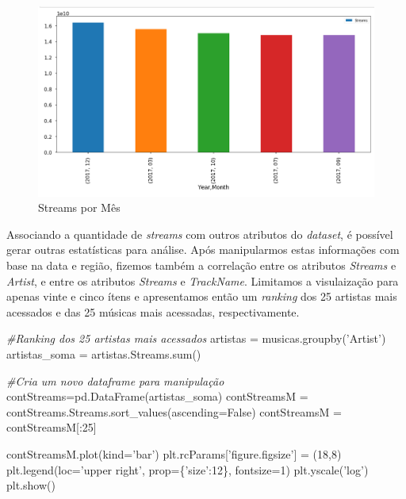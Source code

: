 \documentclass[11pt]{article}
\makeatletter
\def\maxwidth{\ifdim\Gin@nat@width>\linewidth\linewidth
    \else\Gin@nat@width\fi}
\let\Oldincludegraphics\includegraphics
\renewcommand{\includegraphics}[1]{\Oldincludegraphics[width=.8\maxwidth]{#1}}
\newenvironment{Shaded}{}{}
\newcommand{\DecValTok}[1]{\textcolor[rgb]{0.25,0.63,0.44}{{#1}}}
\newcommand{\StringTok}[1]{\textcolor[rgb]{0.25,0.44,0.63}{{#1}}}
\newcommand{\CommentTok}[1]{\textcolor[rgb]{0.38,0.63,0.69}{\textit{{#1}}}}
\newcommand{\NormalTok}[1]{{#1}}
\newcommand{\VariableTok}[1]{\textcolor[rgb]{0.10,0.09,0.49}{{#1}}}
\newcommand{\OperatorTok}[1]{\textcolor[rgb]{0.40,0.40,0.40}{{#1}}}
\newcommand{\BuiltInTok}[1]{{#1}}
\makeatother
\begin{document}
\begin{figure}
\centering
\includegraphics{StreamsPorMes.png}
\caption{Streams por Mês}
\end{figure}

    Associando a quantidade de \emph{streams} com outros atributos do
\emph{dataset}, é possível gerar outras estatísticas para análise. Após
manipularmos estas informações com base na data e região, fizemos também
a correlação entre os atributos \emph{Streams} e \emph{Artist}, e entre
os atributos \emph{Streams} e \emph{TrackName}. Limitamos a visulaização
para apenas vinte e cinco ítens e apresentamos então um \emph{ranking}
dos 25 artistas mais acessados e das 25 músicas mais acessadas,
respectivamente.

\begin{Shaded}
\begin{Highlighting}[]
\CommentTok{#Ranking dos 25 artistas mais acessados}
\NormalTok{artistas }\OperatorTok{=}\NormalTok{ musicas.groupby(}\StringTok{'Artist'}\NormalTok{)}
\NormalTok{artistas_soma }\OperatorTok{=}\NormalTok{ artistas.Streams.}\BuiltInTok{sum}\NormalTok{()}

\CommentTok{#Cria um novo dataframe para manipulação}
\NormalTok{contStreams}\OperatorTok{=}\NormalTok{pd.DataFrame(artistas_soma)}
\NormalTok{contStreamsM }\OperatorTok{=}\NormalTok{ contStreams.Streams.sort_values(ascending}\OperatorTok{=}\VariableTok{False}\NormalTok{)}
\NormalTok{contStreamsM }\OperatorTok{=}\NormalTok{ contStreamsM[:}\DecValTok{25}\NormalTok{]}

\NormalTok{contStreamsM.plot(kind}\OperatorTok{=}\StringTok{'bar'}\NormalTok{)}
\NormalTok{plt.rcParams[}\StringTok{'figure.figsize'}\NormalTok{] }\OperatorTok{=}\NormalTok{ (}\DecValTok{18}\NormalTok{,}\DecValTok{8}\NormalTok{)}
\NormalTok{plt.legend(loc}\OperatorTok{=}\StringTok{'upper right'}\NormalTok{, prop}\OperatorTok{=}\NormalTok{\{}\StringTok{'size'}\NormalTok{:}\DecValTok{12}\NormalTok{\}, fontsize}\OperatorTok{=}\DecValTok{1}\NormalTok{)}
\NormalTok{plt.yscale(}\StringTok{'log'}\NormalTok{)}
\NormalTok{plt.show()}
\end{Highlighting}
\end{Shaded}
\end{document}
